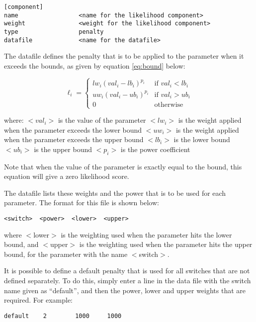 \documentclass[]{book}
\begin{document}
\begin{verbatim}
[component]
name                 <name for the likelihood component>
weight               <weight for the likelihood component>
type                 penalty
datafile             <name for the datafile>
\end{verbatim}

The datafile defines the penalty that is to be applied to the parameter
when it exceeds the bounds, as given by
equation \eqref{eq:bound} below:

\begin{equation}
\label{eq:bound}
\ell_{i} =
\begin{cases}
lw_{i} (val_{i} - lb_{i})^{p_{i}} & \textrm{if $val_{i} < lb_i$} \\
uw_{i} (val_{i} - ub_{i})^{p_{i}} & \textrm{if $val_{i} > ub_i$} \\
0 & \textrm{otherwise}
\end{cases}\end{equation}

where: \(<val_i>\) is the value of the parameter \(<lw_i>\) is the weight
applied when the parameter exceeds the lower bound \(<uw_i>\) is the
weight applied when the parameter exceeds the upper bound \(<lb_i>\) is
the lower bound \(<ub_i>\) is the upper bound \(<p_i>\) is the power
coefficient

Note that when the value of the parameter is exactly equal to the bound,
this equation will give a zero likelihood score.

The datafile lists these weights and the power that is to be used for
each parameter. The format for this file is shown below:

\begin{verbatim}
<switch>  <power>  <lower>  <upper>
\end{verbatim}

where \(<\)lower\(>\) is the weighting used when the parameter hits the
lower bound, and \(<\)upper\(>\) is the weighting used when the parameter
hits the upper bound, for the parameter with the name \(<\)switch\(>\).

It is possible to define a default penalty that is used for all switches
that are not defined separately. To do this, simply enter a line in the
data file with the switch name given as ``default'', and then the power,
lower and upper weights that are required. For example:

\begin{verbatim}
default    2        1000     1000
\end{verbatim}
\end{document}
